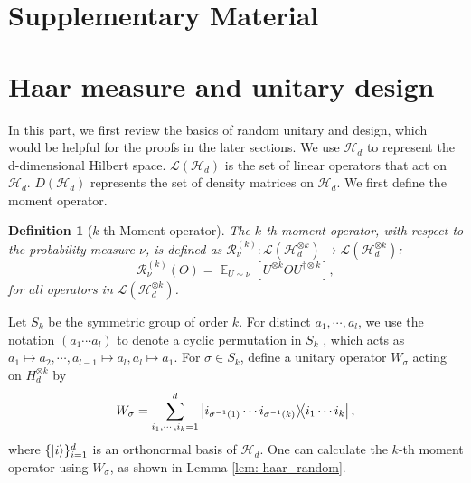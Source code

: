 \documentclass[showpacs,amsmath,amssymb,twocolumn,aps,pra,superscriptaddress,notitlepage,10pt]{revtex4-2}
\newcommand{\bE}{\mathbb E}
\newtheorem{definition}{Definition}
\begin{document}
\clearpage
\onecolumngrid
\section*{Supplementary Material}

\section{Haar measure and unitary design}
In this part, we first review the basics of random unitary and design, which would be helpful for the proofs in the later sections.
We use $\mathcal{H}_d$ to represent the d-dimensional Hilbert space. $\mathcal L(\mathcal H_d)$ is the set of linear operators that act on $\mathcal H_d$. $D(\mathcal{H}_d)$ represents the set of density matrices on $\mathcal{H}_d$. We first define the moment operator.

\begin{definition}[$k$-th Moment operator]
The $k$-th moment operator, with respect to the probability measure $\nu$, is defined as $\mathcal R_\nu^{(k)}:\mathcal L(\mathcal H_d^{\otimes k})\rightarrow\mathcal L(\mathcal H_d^{\otimes k})$:
\begin{equation}
    \mathcal R_\nu^{(k)}(O)=\mathop{\bE}_{U\sim\nu}\left[U^{\otimes k}OU^{\dagger\otimes k}\right],
\end{equation}
for all operators in $\mathcal L(\mathcal H_d^{\otimes k})$.
\end{definition}

Let $S_k$ be the symmetric group of order $k$. For distinct $a_1, \cdots, a_l$, we use the notation $(a_1\cdots a_l)$ to denote a cyclic permutation in $S_k$ , which acts as $a_1\mapsto a_2, \cdots, a_{l-1}\mapsto a_l, a_l\mapsto a_1$. For $\sigma \in S_k$, define a unitary operator $W_\sigma$ acting on $H_d^{\otimes k}$ by
\begin{equation}
	W_\sigma=\sum_{i_1,\cdots,i_k=1}^d \ketbra{i_{\sigma^{-1}(1)}\cdots i_{\sigma^{-1}(k)}}{i_1\cdots i_k},
\end{equation}
where $\{\ket{i}\}_{i=1}^d$ is an orthonormal basis of $\mathcal{H}_d$. One can calculate the $k$-th moment operator using $W_\sigma$, as shown in Lemma \ref{lem: haar_random}.
\end{document}
